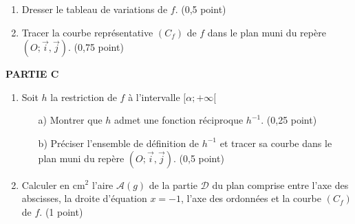 \documentclass[11pt]{article}
\begin{document}
\begin{enumerate}
\begin{enumerate}
    \item[b)] Montrer que \( \forall x \in ]1 ; +\infty[ \),
    \(
    f'(x) = \frac{g(x) e^{x+1}}{x}
    \)
    En déduire le signe de \( f'(x) \) sur \( ]1 ; +\infty[ \). \hfill (0,25 point)
\end{enumerate}

\vspace{0.2cm}
\noindent
\item Dresser le tableau de variations de \( f \). \hfill (0,5 point)

\noindent
\item Tracer la courbe représentative \( (C_f) \) de \( f \) dans le plan muni du repère \( (O; \vec{i}, \vec{j}) \). \hfill (0,75 point)

\end{enumerate}

\textbf{PARTIE C}
\begin{enumerate}

\item Soit \( h \) la restriction de \( f \) à l’intervalle \( [\alpha ; +\infty[ \)

\begin{enumerate}
    \item[a)] Montrer que \( h \) admet une fonction réciproque \( h^{-1} \). \hfill (0,25 point)
    
    \item[b)] Préciser l’ensemble de définition de \( h^{-1} \) et tracer sa courbe dans le plan muni du repère \( (O; \vec{i}, \vec{j}) \). \hfill (0,5 point)
\end{enumerate}

\vspace{0.2cm}
\noindent
\item Calculer en \( \text{cm}^2 \) l’aire \( \mathcal{A}(g) \) de la partie \( \mathcal{D} \) du plan comprise entre l’axe des abscisses, la droite d’équation \( x =-1 \), l’axe des ordonnées et la courbe \( (C_f) \) de \( f \). \hfill (1 point)
\end{enumerate}
\end{document}
